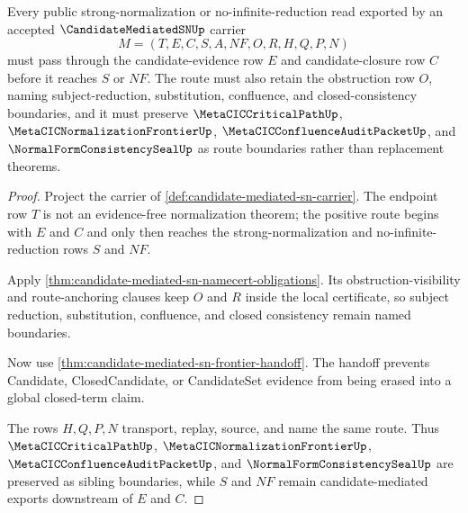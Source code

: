 \begin{theorem}
\label{thm:candidate-mediated-sn-obstruction-frontier}
Every public strong-normalization or no-infinite-reduction read exported by an accepted $\CandidateMediatedSNUp$ carrier
$$
M=(T,E,C,S,A,NF,O,R,H,Q,P,N)
$$
must pass through the candidate-evidence row $E$ and candidate-closure row $C$ before it reaches $S$ or $NF$. The route must also retain the obstruction row $O$, naming subject-reduction, substitution, confluence, and closed-consistency boundaries, and it must preserve $\MetaCICCriticalPathUp$, $\MetaCICNormalizationFrontierUp$, $\MetaCICConfluenceAuditPacketUp$, and $\NormalFormConsistencySealUp$ as route boundaries rather than replacement theorems.
\end{theorem}
\begin{proof}
Project the carrier of \autoref{def:candidate-mediated-sn-carrier}. The endpoint row $T$ is not an evidence-free normalization theorem; the positive route begins with $E$ and $C$ and only then reaches the strong-normalization and no-infinite-reduction rows $S$ and $NF$.

Apply \autoref{thm:candidate-mediated-sn-namecert-obligations}. Its obstruction-visibility and route-anchoring clauses keep $O$ and $R$ inside the local certificate, so subject reduction, substitution, confluence, and closed consistency remain named boundaries.

Now use \autoref{thm:candidate-mediated-sn-frontier-handoff}. The handoff prevents Candidate, ClosedCandidate, or CandidateSet evidence from being erased into a global closed-term claim.

The rows $H,Q,P,N$ transport, replay, source, and name the same route. Thus $\MetaCICCriticalPathUp$, $\MetaCICNormalizationFrontierUp$, $\MetaCICConfluenceAuditPacketUp$, and $\NormalFormConsistencySealUp$ are preserved as sibling boundaries, while $S$ and $NF$ remain candidate-mediated exports downstream of $E$ and $C$.
\end{proof}

